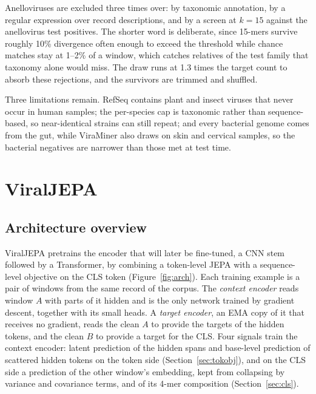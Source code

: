 \documentclass[10pt,twocolumn,a4paper]{article}
\begin{document}
Anelloviruses are excluded three times over: by taxonomic annotation, by a
regular expression over record descriptions, and by a screen at $k=15$ against
the anellovirus test positives. The shorter word is deliberate, since 15-mers
survive roughly 10\% divergence often enough to exceed the threshold while chance
matches stay at 1--2\% of a window, which catches relatives of the test family
that taxonomy alone would miss. The draw runs at 1.3 times the target count to
absorb these rejections, and the survivors are trimmed and shuffled.

Three limitations remain. RefSeq contains plant and insect viruses that never
occur in human samples; the per-species cap is taxonomic rather than
sequence-based, so near-identical strains can still repeat; and every bacterial
genome comes from the gut, while ViraMiner also draws on skin and cervical
samples, so the bacterial negatives are narrower than those met at test time.

\section{ViralJEPA}\label{sec:method}

\subsection{Architecture overview}\label{sec:arch}

ViralJEPA pretrains the encoder that will later be fine-tuned, a CNN stem
followed by a Transformer, by combining a token-level JEPA with a sequence-level
objective on the CLS token (Figure~\ref{fig:arch}). Each training example is a
pair of windows from the same record of the corpus. The \emph{context encoder}
reads window $A$ with parts of it hidden and is the only network trained by
gradient descent, together with its small heads. A \emph{target encoder}, an EMA
copy of it that receives no gradient, reads the clean $A$ to provide the targets
of the hidden tokens, and the clean $B$ to provide a target for the CLS. Four
signals train the context encoder: latent prediction of the hidden spans and
base-level prediction of scattered hidden tokens on the token side
(Section~\ref{sec:tokobj}), and on the CLS side a prediction of the other
window's embedding, kept from collapsing by variance and covariance terms, and of
its 4-mer composition (Section~\ref{sec:cls}).
\end{document}
